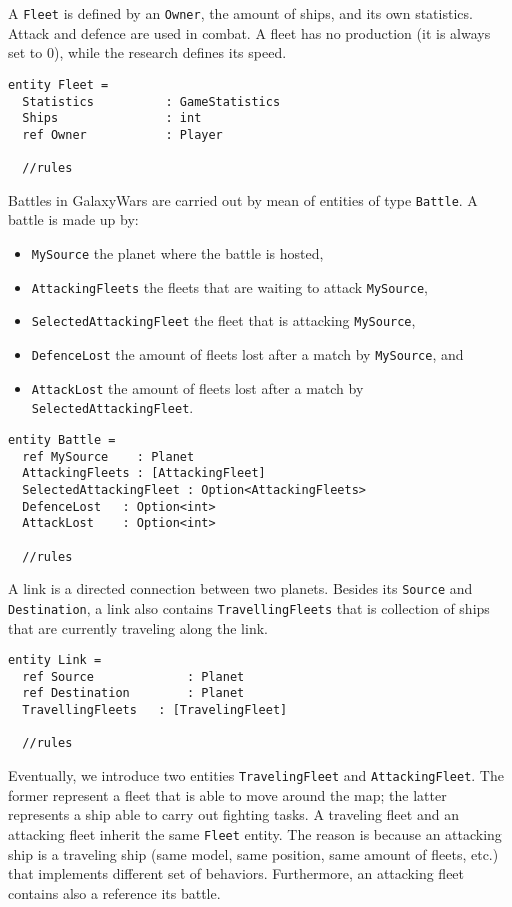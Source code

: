 \noindent
A \texttt{Fleet} is defined by an \texttt{Owner}, the amount of ships, and its own statistics. Attack and defence are used in combat. A fleet has no production (it is always set to 0), while the research defines its speed.

\begin{lstlisting}
entity Fleet =
  Statistics          : GameStatistics
  Ships               : int
  ref Owner           : Player
  
  //rules
\end{lstlisting}


\noindent
Battles in GalaxyWars are carried out by mean of entities of type \texttt{Battle}. A battle is made up by:
\begin{itemize}
	\item \texttt{MySource} the planet where the battle is hosted, 	
	\item \texttt{AttackingFleets} the fleets that are waiting to attack \texttt{MySource},
	\item \texttt{SelectedAttackingFleet} the fleet that is attacking \texttt{MySource},
	\item \texttt{DefenceLost} the amount of fleets lost after a match by \texttt{MySource}, and
	\item \texttt{AttackLost} the amount of fleets lost after a match by \texttt{SelectedAttackingFleet}.
\end{itemize}

\begin{lstlisting}
entity Battle =
  ref MySource    : Planet
  AttackingFleets : [AttackingFleet] 
  SelectedAttackingFleet : Option<AttackingFleets>
  DefenceLost   : Option<int>
  AttackLost    : Option<int>
  
  //rules  
\end{lstlisting}

\noindent
A link is a directed connection between two planets. Besides its \texttt{Source} and \texttt{Destination}, a link also contains \texttt{TravellingFleets} that is collection of ships that are currently traveling along the link. 

\begin{lstlisting}
entity Link =
  ref Source             : Planet
  ref Destination        : Planet
  TravellingFleets   : [TravelingFleet]
  
  //rules
\end{lstlisting}

Eventually, we introduce two entities \texttt{TravelingFleet} and \texttt{AttackingFleet}. The former represent a fleet that is able to move around the map; the latter represents a ship able to carry out fighting tasks. A traveling fleet and an attacking fleet inherit the same \texttt{Fleet} entity. The reason is because an attacking ship is a traveling ship (same model, same position, same amount of fleets, etc.) that implements different set of behaviors. Furthermore, an attacking fleet contains also a reference its battle.

